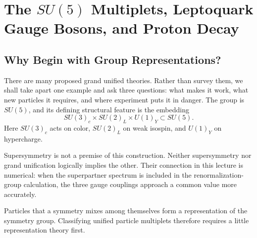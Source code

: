 \chapter{The \texorpdfstring{\(SU(5)\)}{SU(5)} Multiplets, Leptoquark Gauge Bosons, and Proton Decay}


\section{Why Begin with Group Representations?}

There are many proposed grand unified theories. Rather than survey them, we shall take apart one example and ask three questions: what makes it work, what new particles it requires, and where experiment puts it in danger. The group is \(SU(5)\), and its defining structural feature is the embedding
\begin{equation}
SU(3)_c\times SU(2)_L\times U(1)_Y
\subset SU(5).
\label{eq:l10-sm-embedding}
\end{equation}
Here \(SU(3)_c\) acts on color, \(SU(2)_L\) on weak isospin, and \(U(1)_Y\) on hypercharge.

Supersymmetry is not a premise of this construction. Neither supersymmetry nor grand unification logically implies the other. Their connection in this lecture is numerical: when the superpartner spectrum is included in the renormalization-group calculation, the three gauge couplings approach a common value more accurately.

Particles that a symmetry mixes among themselves form a representation of the symmetry group. Classifying unified particle multiplets therefore requires a little representation theory first.

